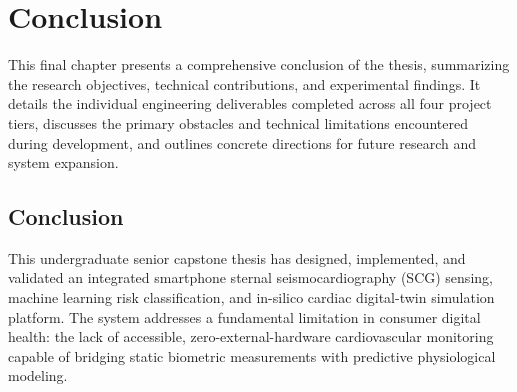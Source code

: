 \chapter{Conclusion}

This final chapter presents a comprehensive conclusion of the thesis, summarizing the research objectives, technical contributions, and experimental findings. It details the individual engineering deliverables completed across all four project tiers, discusses the primary obstacles and technical limitations encountered during development, and outlines concrete directions for future research and system expansion.

\section{Conclusion}

This undergraduate senior capstone thesis has designed, implemented, and validated an integrated smartphone sternal seismocardiography (SCG) sensing, machine learning risk classification, and in-silico cardiac digital-twin simulation platform. The system addresses a fundamental limitation in consumer digital health: the lack of accessible, zero-external-hardware cardiovascular monitoring capable of bridging static biometric measurements with predictive physiological modeling.

